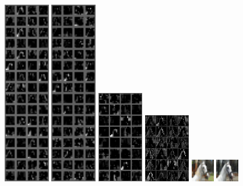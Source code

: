 \documentclass[11pt]{article}
\begin{document}
\begin{enumerate}
\begin{center}
        \includegraphics[width=2cm]{act1_unet/filter_out1_1.png}
        \includegraphics[width=2cm]{act1_unet/filter_out2_1.png}
        \includegraphics[width=2cm]{act1_unet/filter_out3_1.png}
        \includegraphics[width=2cm]{act1_unet/filter_out4_1.png}
        \includegraphics[width=1cm]{act1_unet/filter_output_1.png}
        \includegraphics[width=1cm]{act1_unet/filter_input_rgb_1.png}
    \end{center}
\end{enumerate}
\end{document}
